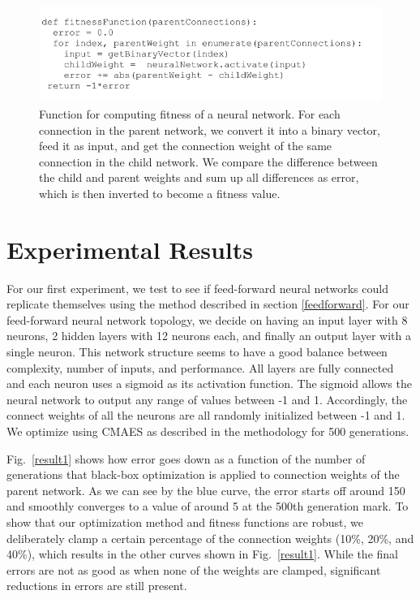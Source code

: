\documentclass[12pt]{article}
\begin{document}
\begin{figure}[h]
\begin{center}
  \includegraphics[width=0.8\linewidth]{pseudo.png}
\end{center}
   \caption{Function for computing fitness of a neural network. For each connection in the parent network, we convert it into a binary vector, feed it as input, and get the connection weight of the same connection in the child network. We compare the difference between the child and parent weights and sum up all differences as error, which is then inverted to become a fitness value.}
\label{pseudo}
\end{figure} 

\section{Experimental Results}
\label{results}

For our first experiment, we test to see if feed-forward neural networks could replicate themselves using the method described in section \ref{feedforward}. For our feed-forward neural network topology, we decide on having an input layer with 8 neurons, 2 hidden layers with 12 neurons each, and finally an output layer with a single neuron. This network structure seems to have a good balance between complexity, number of inputs, and performance. All layers are fully connected and each neuron uses a sigmoid as its activation function. The sigmoid allows the neural network to output any range of values between -1 and 1. Accordingly, the connect weights of all the neurons are all randomly initialized between -1 and 1. We optimize using CMAES as described in the methodology for 500 generations.

Fig.~\ref{result1} shows how error goes down as a function of the number of generations that black-box optimization is applied to connection weights of the parent network. As we can see by the blue curve, the error starts off around 150 and smoothly converges to a value of around 5 at the 500th generation mark. To show that our optimization method and fitness functions are robust, we deliberately clamp a certain percentage of the connection weights (10\%, 20\%, and 40\%), which results in the other curves shown in Fig.~\ref{result1}. While the final errors are not as good as when none of the weights are clamped, significant reductions in errors are still present.
\end{document}
